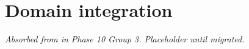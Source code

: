 \chapter{Domain integration}
\label{chap:domain-integration}

\textit{Absorbed from 
in Phase 10 Group 3. Placeholder until migrated.}
